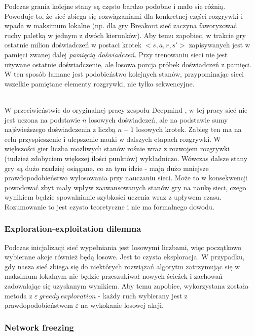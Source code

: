 \documentclass[12pt]{article}
\begin{document}
Podczas grania kolejne stany są często bardzo podobne i mało się różnią. Powoduje to, że sieć zbiega się rozwiązaniami dla konkretnej części rozgrywki i wpada w maksimum lokalne (np. dla gry Breakout sieć zaczyna faworyzować ruchy paletką w jednym z dwóch kierunków). Aby temu zapobiec, w trakcie gry ostatnie milion doświadczeń w postaci krotek $<s, a, r, s'>$ zapisywanych jest w pamięci zwanej dalej \textit{pamięcią doświadczeń}. Przy trenowaniu sieci nie jest używane ostatnie doświadczenie, ale losowa porcja próbek doświadczeń z pamięci. W ten sposób łamane jest podobieństwo kolejnych stanów, przypominając sieci wszelkie pamiętane elementy rozgrywki, nie tylko sekwencyjne.
\\\

W przeciwieństwie do oryginalnej pracy zespołu Deepmind \cite{deepmind_2}, w tej pracy sieć nie jest uczona na podstawie $n$ losowych doświadczeń, ale na podstawie sumy najświeższego doświadczenia z liczbą $n-1$ losowych krotek. Zabieg ten ma na celu przyspieszenie i ulepszenie nauki w dalszych etapach rozgrywki. W większości gier liczba możliwych stanów rośnie wraz z rozwojem rozgrywki (tudzież zdobyciem większej ilości punktów) wykładniczo. Wówczas dalsze stany gry są dużo rzadziej osiągane, co za tym idzie - mają dużo mniejsze prawdopodobieństwo wylosowania przy nauczaniu sieci. Może to w konsekwencji powodować zbyt mały wpływ zaawansowanych stanów gry na naukę sieci, czego wynikiem będzie spowalnianie szybkości uczenia wraz z upływem czasu.
\\
Rozumowanie to jest czysto teoretyczne i nie ma formalnego dowodu.

\subsubsection{Exploration-exploitation dilemma}

Podczas inicjalizacji sieć wypełniania jest losowymi liczbami, więc początkowo wybierane akcje również będą losowe. Jest to czysta eksploracja. W przypadku, gdy nasza sieć zbiega się do niektórych rozwiązań algorytm zatrzymując się w maksimum lokalnym nie będzie przeszukiwał nowych ścieżek i zachowań zadowalając się uzyskanym wynikiem. Aby temu zapobiec, wykorzystana została metoda z $\varepsilon\ greedy\ exploration$ - każdy ruch wybierany jest z prawdopodobieństwem $\varepsilon$ na wykokanie losowej akcji.

\subsubsection{Network freezing}
\end{document}
